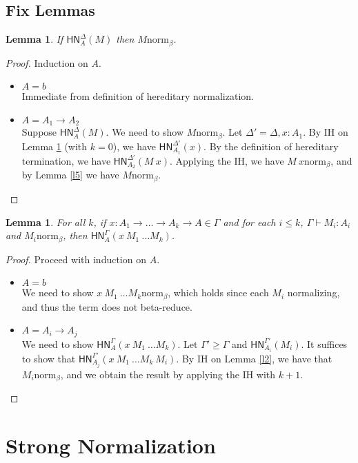 \documentclass{article}
\newtheorem{lem}[thm]{Lemma}
\newtheorem*{lemm}{Lemma}
\newcommand{\hasEF}[3]{\ensuremath{#1 \vdash #2 : #3}}
\newcommand{\bnorm}[1]{#1 \mathrel{\text{norm}_\beta}}
\newcommand{\hnorm}[3]{\ensuremath{\mathsf{HN}^{#1}_{#2}(#3)}}
\newcommand{\fn}[2]{\ensuremath{#1 \to #2}}
\newcommand{\ap}[2]{\ensuremath{#1\ #2}}
\begin{document}
\subsection{Fix Lemmas}

\begin{lemm}
If $\hnorm{\Delta}{A}{M}$ then $\bnorm{M}$.
\end{lemm}

\begin{proof}
Induction on $A$.
\begin{itemize}
  \setlength\itemsep{1em}
  \item $A = b$\\
  Immediate from definition of hereditary normalization.
  \item $A = \fn{A_1}{A_2}$\\
  Suppose $\hnorm{\Delta}{A}{M}$. We need to show $\bnorm{M}$. Let $\Delta' = \Delta, x : A_1$. By IH on Lemma \ref{l4} 
  (with $k = 0$), we have $\hnorm{\Delta'}{A_1}{x}$. By the definition of hereditary termination, we have 
  $\hnorm{\Delta'}{A_2}{\ap{M}{x}}$. Applying the IH, we have $\bnorm{\ap{M}{x}}$, and by Lemma \ref{l5} we have 
  $\bnorm{M}$. 
  \qedhere
\end{itemize}
\end{proof}

\begin{lem}\label{l4}
For all $k$, if $x : A_1 \to \dots \to A_k \to A \in \Gamma$ and for each $i \le k$, $\hasEF{\Gamma}{M_i}{A_i}$ and $\bnorm{M_i}$, then $\hnorm{\Gamma}{A}{\ap{\ap{x}{M_1}}{\dots M_k}}$.
\end{lem}

\begin{proof}
Proceed with induction on $A$.
\begin{itemize}
  \setlength\itemsep{1em}
  \item $A = b$\\
  We need to show $\bnorm{\ap{\ap{x}{M_1}}{\dots M_k}}$, which holds since each $M_i$ normalizing, and thus the 
  term does not beta-reduce.
  \item $A = \fn{A_i}{A_j}$\\
  We need to show $\hnorm{\Gamma}{A}{\ap{\ap{x}{M_1}}{\dots M_k}}$. Let $\Gamma' \ge \Gamma$ and 
  $\hnorm{\Gamma'}{A_i}{M_i}$. It suffices to show that $\hnorm{\Gamma'}{A_j}{\ap{\ap{\ap{x}{M_1}}{\dots M_k}}{M_i}}$.
  By IH on Lemma \ref{l2}, we have that $\bnorm{M_i}$, and we obtain the result by applying the IH with $k + 1$.
\end{itemize}
\end{proof}

\section{Strong Normalization}


\end{document}
